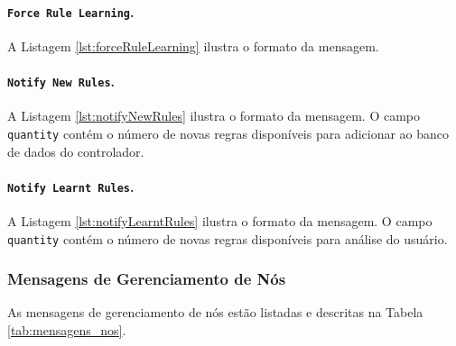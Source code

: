 \paragraph*{\texttt{Force Rule Learning}.} A Listagem \ref{lst:forceRuleLearning} ilustra o formato da mensagem.

\noindent
\begin{minipage}[l]{\linewidth}

\end{minipage}

\paragraph*{\texttt{Notify New Rules}.} A Listagem \ref{lst:notifyNewRules} ilustra o formato da mensagem. O campo \texttt{quantity} contém o número de novas regras disponíveis para adicionar ao banco de dados do controlador.

\noindent
\begin{minipage}[l]{\linewidth}

\end{minipage}

\paragraph*{\texttt{Notify Learnt Rules}.} A Listagem \ref{lst:notifyLearntRules} ilustra o formato da mensagem. O campo \texttt{quantity} contém o número de novas regras disponíveis para análise do usuário.

\noindent
\begin{minipage}[l]{\linewidth}

\end{minipage}

\subsubsection{Mensagens de Gerenciamento de Nós}
As mensagens de gerenciamento de nós estão listadas e descritas na Tabela \ref{tab:mensagens_nos}.

